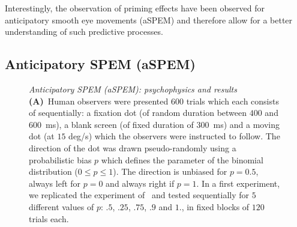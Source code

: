 \documentclass[profile,final,english, draft]{article}%
\newcommand{\ms}{\si{\milli\second}}%
\newcommand{\citep}[1]{\parencite{#1}}
\begin{document}
Interestingly, the observation of priming effects
have been observed for anticipatory smooth eye movements (aSPEM)
and therefore allow for a better understanding of such predictive processes. %
\subsection{Anticipatory SPEM (aSPEM)}
\begin{figure}%
\caption{\emph{Anticipatory SPEM (aSPEM): psychophysics and results} %
\textbf{(A)}~Human observers were presented $600$ trials %
which each consists of sequentially:
a fixation dot (of random duration between $400$ and $600$~\ms),
a blank screen (of fixed duration of  $300$~\ms) and
a moving dot (at $15$ deg/s) which the observers were instructed to follow.
The direction of the dot was drawn pseudo-randomly
using a probabilistic bias $p$ which defines the parameter
of the binomial distribution
($0\leq p\leq 1 $). The direction is unbiased for $p=0.5$,
always left for $p=0$ and always right if $p=1$.
In a first experiment,
we replicated the experiment of~\citep{Montagnini2010} and
tested sequentially for $5$ different values of $p$:
$.5$, $.25$, $.75$, $.9$ and $1.$,
in fixed blocks of $120$ trials each.
}
\end{figure}
\end{document}
